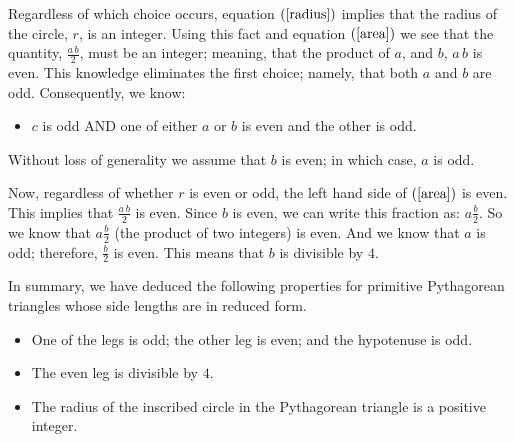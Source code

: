 \documentclass[12pt]{article}
\begin{document}
Regardless of which choice occurs, equation $(\ref{radius})$ implies that 
the radius of the circle, $r$, is an integer.
\eject
Using this fact and equation $(\ref{area})$ we see that the quantity, 
$\frac{a \, b}{2}$, must be an integer; meaning, that the product 
of $a$, and $b$, $a \, b$ is even.
This knowledge eliminates the first choice; namely, that both $a$ and $b$ 
are odd. Consequently, we know:
\begin{itemize}
    \item{$c$ is odd AND one of either $a$ or $b$ is even and the other is odd.}
\end{itemize}
Without loss of generality we assume that $b$ is even; in which case, $a$ is odd.

Now, regardless of whether $r$ is even or odd, the left hand side of 
$(\ref{area})$ is even. This implies that $\frac{a \, b}{2}$
is even. Since $b$ is even, we can write this fraction as: $a \frac{b}{2}$.
So we know that $a \frac{b}{2}$ (the product of two integers) is even.
And we know that $a$ is odd; therefore, $\frac{b}{2}$ is even.
This means that $b$ is divisible by $4$.

In summary, we have deduced the following properties for primitive Pythagorean triangles
whose side lengths are in reduced form.
\begin{itemize}
  \item{One of the legs is odd; the other leg is even; and the hypotenuse 
      is odd.}
  \item{The even leg is divisible by $4$.}
  \item{The radius of the inscribed circle in the Pythagorean triangle
      is a positive integer.}
\end{itemize}
\end{document}
